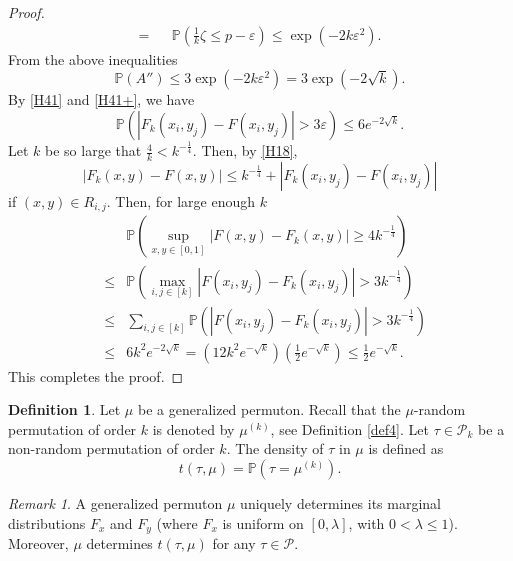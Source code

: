 \documentclass[12pt,twoside]{article}
\theoremstyle{definition}
\newtheorem{definition}[theorem]{Definition}
\theoremstyle{remark}
\numberwithin{equation}{section}
\theoremstyle{plain}
\theoremstyle{remark}
\newtheorem{rem}{Remark}[section]
\def\P{{\mathbb {P}}}                       \def\Q{{\mathbb {Q}}}
\def\PD{{\mathcal P}}                     \def\PDW{{\tilde{\cal P}}}
\def\PD{{\mathcal P}}
\begin{document}
\begin{proof}
\begin{eqnarray*}
= &&   \P\left(\frac{1}{k} \zeta \le p-\varepsilon \right)
\le \exp (-2k \varepsilon^2 ) .
\end{eqnarray*}
From the above inequalities
$$
\P(A'') \le 3 \exp (-2k \varepsilon^2 ) = 3 \exp (-2\sqrt{k}).
$$
By \eqref{H41} and \eqref{H41+}, we have
\begin{equation} \label{H40}
\P \left( |F_k(x_i,y_j) - F(x_i,y_j)| > 3\varepsilon   \right)
\le 6 e^{-2\sqrt{k}} .
\end{equation} 
Let $k$ be so large that $\frac{4}{k} <k^{-\frac{1}{4}}$.
Then, by \eqref{H18},
$$
| F_k(x,y)- F(x,y) |\le   k^{-\frac{1}{4}}+ | F_k(x_i,y_j)- F(x_i,y_j) | 
$$
if $(x,y) \in R_{i,j}$.
Then, for large enough $k$
\begin{eqnarray*} 
&&\P \left( \sup_{x,y\in[0,1]} |F(x,y) -F_k(x,y)| \ge 4 k^{-\frac{1}{4}}   \right) \\
&\le & 
\P \left( \max_{i,j\in[k]} |F(x_i,y_j) -F_k(x_i,y_j)| > 3 k^{-\frac{1}{4}}   \right) \\
&\le & 
\sum_{i,j\in[k]}
\P \left( |F(x_i,y_j) -F_k(x_i,y_j)| > 3 k^{-\frac{1}{4}}   \right) \\
&\le & 
6 k^2 e^{-2\sqrt{k}}
= \left( 12 k^2 e^{-\sqrt{k}} \right) \left(\frac{1}{2} e^{-\sqrt{k}}\right) \le
\frac{1}{2} e^{-\sqrt{k}}.     
\end{eqnarray*}
This completes the proof.
\end{proof}
%

\begin{definition}  \label{def5}
Let $\mu$ be a generalized permuton.
Recall that the $\mu$-random  permutation of order $k$ is denoted by
$\mu^{(k)}$, see Definition \ref{def4}.
Let $\tau\in \PD_k$ be a non-random  permutation of order $k$.
The density of $\tau$  in $\mu$ is defined as
\begin{equation}  \label{H24}
t(\tau, \mu) =\P \left(\tau= \mu^{(k)}\right).
\end{equation}
\end{definition}
%

\begin{rem}
A generalized permuton $\mu$ uniquely determines its marginal distributions $F_x$ and $F_y$
(where $F_x$ is uniform on $[0, \lambda]$, with $0< \lambda\le 1$).
Moreover, $\mu$ determines  $t(\tau, \mu)$ for any $\tau \in \PD$.
\end{rem}
%
\end{document}
